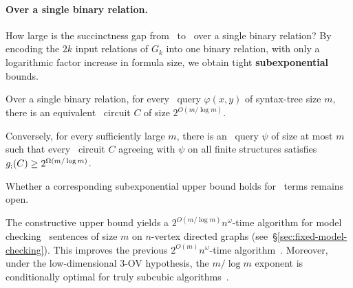 \paragraph{Over a single binary relation.}
How large is the succinctness gap from \FOthree\ to \CoR\ over a single binary relation? By encoding the $2k$ input relations of $G_k$ into one binary relation,
with only a logarithmic factor increase in formula size, we obtain tight \textbf{subexponential} bounds.

\begin{theorem}
\label{thm:fixed-vocabulary}
Over a single binary relation,
for every \FOthree\ query $\varphi(x,y)$ of syntax-tree size $m$,
there is an equivalent \CoR\ circuit $C$ of size
$2^{O(m/\log m)}$.

Conversely, for every sufficiently large $m$,
there is an \FOthree\ query $\psi$ of size at most $m$ such that
every \CoR\ circuit $C$ agreeing with $\psi$ on
all finite structures satisfies
$g_{;}(C)\ge 2^{\Omega(m/\log m)}$.


\end{theorem}

Whether a corresponding subexponential upper bound holds for \CoR\ terms remains open.

\smallskip
{}
The constructive upper bound yields a
$2^{O(m/\log m)}n^\omega$-time algorithm for model checking \FOthree\ sentences of size $m$ on $n$-vertex directed graphs (see~\S\ref{sec:fixed-model-checking}).
This improves the previous $2^{O(m)}n^\omega$-time algorithm~\citep[Theorem~10]{nakamura-uezato2027}.
Moreover, under the low-dimensional 3-OV hypothesis,
the $m/\log m$ exponent is conditionally optimal for truly subcubic algorithms~\citep[Theorem~72]{nakamura-uezato2027}.

